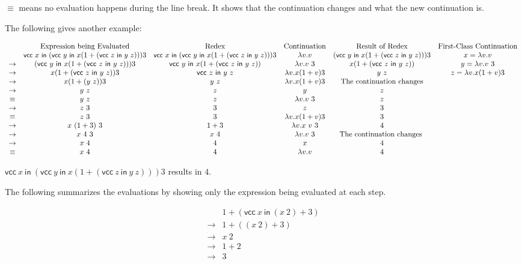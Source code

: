 $\equiv$ means no evaluation happens during the line break. It shows that the
continuation changes and what the new continuation is.

The following gives another example:

\[
\begin{array}{cccccc}
&\text{Expression being Evaluated} & \text{Redex} & \text{Continuation} &
\text{Result of Redex} & \text{First-Class Continuation} \\
& \small{\textsf{vcc}\ x\ \textsf{in}\ (\textsf{vcc}\ y\ \textsf{in}\
x(1+(\textsf{vcc}\ z\ \textsf{in}\ y\ z)))3}
& \small{\textsf{vcc}\ x\ \textsf{in}\ (\textsf{vcc}\ y\ \textsf{in}\
x(1+(\textsf{vcc}\ z\ \textsf{in}\ y\ z)))3}
& \lambda v.v
& \small{(\textsf{vcc}\ y\ \textsf{in}\ x(1+(\textsf{vcc}\ z\ \textsf{in}\ y\
z)))3}
& x=\lambda v.v \\
\rightarrow & (\textsf{vcc}\ y\ \textsf{in}\ x(1+(\textsf{vcc}\ z\ \textsf{in}\
y\ z)))3
& \textsf{vcc}\ y\ \textsf{in}\ x(1+(\textsf{vcc}\ z\ \textsf{in}\ y\ z))
& \lambda v.v\ 3
& x(1+(\textsf{vcc}\ z\ \textsf{in}\ y\ z))
& y=\lambda v.v\ 3 \\
\rightarrow & x(1+(\textsf{vcc}\ z\ \textsf{in}\ y\ z))3
& \textsf{vcc}\ z\ \textsf{in}\ y\ z
& \lambda v.x(1+v)3
& y\ z
& z=\lambda v.x(1+v)3 \\
\rightarrow & x(1+(y\ z))3 & y\ z & \lambda v.x(1+v)3 & \text{The continuation
changes} \\
\rightarrow & y\ z & z & y & z \\
\equiv & y\ z & z & \lambda v.v\ 3 & z \\
\rightarrow & z\ 3 & 3 & z & 3 \\
\equiv & z\ 3 & 3 & \lambda v.x(1+v)3 & 3 \\
\rightarrow & x\ (1+3)\ 3 & 1+3 & \lambda v.x\ v\ 3 & 4\\
\rightarrow & x\ 4\ 3 & x\ 4 & \lambda v.v\ 3 & \text{The continuation changes }
\\
\rightarrow & x\ 4 & 4 & x & 4\\
\equiv & x\ 4 & 4 & \lambda v.v & 4 \\
\end{array}
\]

$\textsf{vcc}\ x\ \textsf{in}\ (\textsf{vcc}\ y\ \textsf{in}\ x(1+(\textsf{vcc}\
z\ \textsf{in}\ y\ z)))3$ results in $4$.

The following summarizes the evaluations by showing only the expression being
evaluated at each step.

\[
\begin{array}{cl}
& 1+(\textsf{vcc}\ x\ \textsf{in}\ (x\ 2)+3) \\
\rightarrow& 1+((x\ 2)+3)  \\
\rightarrow& x\ 2 \\
\rightarrow& 1+2 \\
\rightarrow& 3 \\
\end{array}
\]


